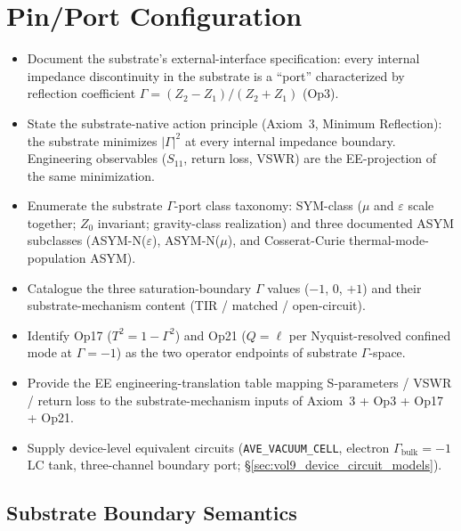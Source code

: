 \chapter{Pin/Port Configuration}
\label{ch:vol9_pin_port_configuration}

\begin{objectivebox}
\begin{itemize}
    \item Document the substrate's external-interface specification: every internal impedance discontinuity in the substrate is a ``port'' characterized by reflection coefficient $\Gamma = (Z_2 - Z_1)/(Z_2 + Z_1)$ (Op3).
    \item State the substrate-native action principle (Axiom~3, Minimum Reflection): the substrate minimizes $|\Gamma|^2$ at every internal impedance boundary. Engineering observables ($S_{11}$, return loss, VSWR) are the EE-projection of the same minimization.
    \item Enumerate the substrate $\Gamma$-port class taxonomy: SYM-class ($\mu$ and $\varepsilon$ scale together; $Z_0$ invariant; gravity-class realization) and three documented ASYM subclasses (ASYM-N($\varepsilon$), ASYM-N($\mu$), and Cosserat-Curie thermal-mode-population ASYM).
    \item Catalogue the three saturation-boundary $\Gamma$ values ($-1$, $0$, $+1$) and their substrate-mechanism content (TIR / matched / open-circuit).
    \item Identify Op17 ($T^2 = 1 - \Gamma^2$) and Op21 ($Q = \ell$ per Nyquist-resolved confined mode at $\Gamma = -1$\gammaundeclared{}) as the two operator endpoints of substrate $\Gamma$-space.
    \item Provide the EE engineering-translation table mapping S-parameters / VSWR / return loss to the substrate-mechanism inputs of Axiom~3 + Op3 + Op17 + Op21.
    \item Supply device-level equivalent circuits (\texttt{AVE\_VACUUM\_CELL}, electron $\Gamma_{\mathrm{bulk}}=-1$ LC tank, three-channel boundary port; \S\ref{sec:vol9_device_circuit_models}).
\end{itemize}
\end{objectivebox}

\section{Substrate Boundary Semantics}
\label{sec:vol9_substrate_boundary_semantics}

